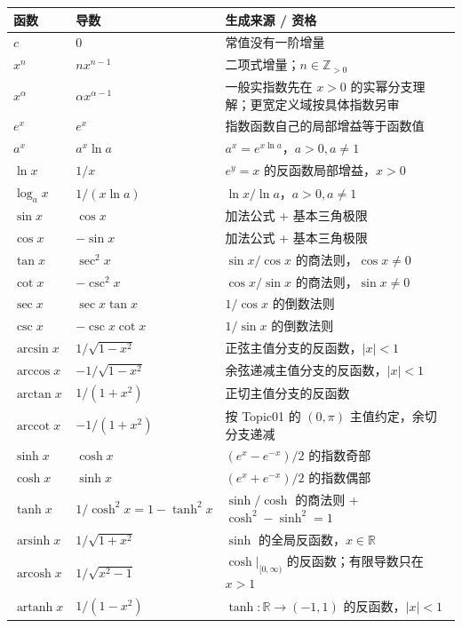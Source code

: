 \documentclass[11pt,a4paper]{ctexart}
\begin{document}
\begin{center}
\begin{tabularx}{\linewidth}{L{3.35cm}L{4.15cm}Y}
\toprule
\textbf{函数} & \textbf{导数} & \textbf{生成来源 / 资格}\\
\midrule
$c$ & $0$ & 常值没有一阶增量\\
$x^n$ & $nx^{n-1}$ & 二项式增量；$n\in\mathbb Z_{>0}$\\
$x^\alpha$ & $\alpha x^{\alpha-1}$ & 一般实指数先在 $x>0$ 的实幂分支理解；更宽定义域按具体指数另审\\
$e^x$ & $e^x$ & 指数函数自己的局部增益等于函数值\\
$a^x$ & $a^x\ln a$ & $a^x=e^{x\ln a}$，$a>0,a\ne1$\\
$\ln x$ & $1/x$ & $e^y=x$ 的反函数局部增益，$x>0$\\
$\log_a x$ & $1/(x\ln a)$ & $\ln x/\ln a$，$a>0,a\ne1$\\
$\sin x$ & $\cos x$ & 加法公式 + 基本三角极限\\
$\cos x$ & $-\sin x$ & 加法公式 + 基本三角极限\\
$\tan x$ & $\sec^2x$ & $\sin x/\cos x$ 的商法则，$\cos x\ne0$\\
$\cot x$ & $-\csc^2x$ & $\cos x/\sin x$ 的商法则，$\sin x\ne0$\\
$\sec x$ & $\sec x\tan x$ & $1/\cos x$ 的倒数法则\\
$\csc x$ & $-\csc x\cot x$ & $1/\sin x$ 的倒数法则\\
$\arcsin x$ & $1/\sqrt{1-x^2}$ & 正弦主值分支的反函数，$\lvert x\rvert<1$\\
$\arccos x$ & $-1/\sqrt{1-x^2}$ & 余弦递减主值分支的反函数，$\lvert x\rvert<1$\\
$\arctan x$ & $1/(1+x^2)$ & 正切主值分支的反函数\\
$\operatorname{arccot}x$ & $-1/(1+x^2)$ & 按 Topic01 的 $(0,\pi)$ 主值约定，余切分支递减\\
$\sinh x$ & $\cosh x$ & $(e^x-e^{-x})/2$ 的指数奇部\\
$\cosh x$ & $\sinh x$ & $(e^x+e^{-x})/2$ 的指数偶部\\
$\tanh x$ & $1/\cosh^2x=1-\tanh^2x$ & $\sinh/\cosh$ 的商法则 + $\cosh^2-\sinh^2=1$\\
$\operatorname{arsinh}x$ & $1/\sqrt{1+x^2}$ & $\sinh$ 的全局反函数，$x\in\mathbb R$\\
$\operatorname{arcosh}x$ & $1/\sqrt{x^2-1}$ & $\cosh\vert_{[0,\infty)}$ 的反函数；有限导数只在 $x>1$\\
$\operatorname{artanh}x$ & $1/(1-x^2)$ & $\tanh:\mathbb R\to(-1,1)$ 的反函数，$\lvert x\rvert<1$\\
\bottomrule
\end{tabularx}
\end{center}
\end{document}
